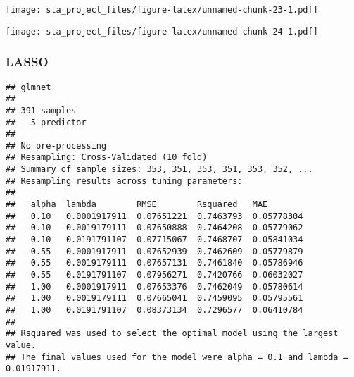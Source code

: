 \documentclass[
]{article}
\newenvironment{Shaded}{\begin{snugshade}}{\end{snugshade}}
\newcommand{\CommentTok}[1]{\textcolor[rgb]{0.56,0.35,0.01}{\textit{#1}}}
\newcommand{\DataTypeTok}[1]{\textcolor[rgb]{0.13,0.29,0.53}{#1}}
\newcommand{\DecValTok}[1]{\textcolor[rgb]{0.00,0.00,0.81}{#1}}
\newcommand{\KeywordTok}[1]{\textcolor[rgb]{0.13,0.29,0.53}{\textbf{#1}}}
\newcommand{\NormalTok}[1]{#1}
\newcommand{\OperatorTok}[1]{\textcolor[rgb]{0.81,0.36,0.00}{\textbf{#1}}}
\newcommand{\StringTok}[1]{\textcolor[rgb]{0.31,0.60,0.02}{#1}}
\begin{document}
\texttt{[image: sta\_project\_files/figure-latex/unnamed-chunk-23-1.pdf]}

\texttt{[image: sta\_project\_files/figure-latex/unnamed-chunk-24-1.pdf]}

\hypertarget{lasso}{%
\subsubsection{LASSO}\label{lasso}}

\begin{Shaded}
\end{Shaded}

\begin{verbatim}
## glmnet 
## 
## 391 samples
##   5 predictor
## 
## No pre-processing
## Resampling: Cross-Validated (10 fold) 
## Summary of sample sizes: 353, 351, 353, 351, 353, 352, ... 
## Resampling results across tuning parameters:
## 
##   alpha  lambda        RMSE        Rsquared   MAE       
##   0.10   0.0001917911  0.07651221  0.7463793  0.05778304
##   0.10   0.0019179111  0.07650888  0.7464208  0.05779062
##   0.10   0.0191791107  0.07715067  0.7468707  0.05841034
##   0.55   0.0001917911  0.07652939  0.7462609  0.05779879
##   0.55   0.0019179111  0.07657131  0.7461840  0.05786946
##   0.55   0.0191791107  0.07956271  0.7420766  0.06032027
##   1.00   0.0001917911  0.07653376  0.7462049  0.05780614
##   1.00   0.0019179111  0.07665041  0.7459095  0.05795561
##   1.00   0.0191791107  0.08373134  0.7296577  0.06410784
## 
## Rsquared was used to select the optimal model using the largest value.
## The final values used for the model were alpha = 0.1 and lambda = 0.01917911.
\end{verbatim}
\end{document}
